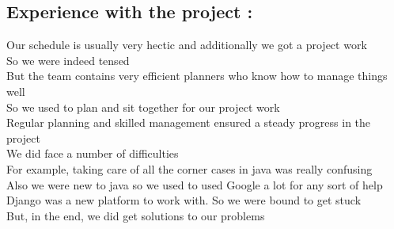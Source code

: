 \documentclass{article}
\begin{document}
\subsection*{Experience with the project : }
\hspace*{5 mm}Our schedule is usually very hectic and additionally we got a project work \\
\hspace*{5 mm}So we were indeed tensed \\
\hspace*{5 mm}But the team contains very efficient planners who know how to manage things well \\
\hspace*{5 mm}So we used to plan and sit together for our project work \\
\hspace*{5 mm}Regular planning and skilled management ensured a steady progress in the project \\
\hspace*{5 mm}We did face a number of difficulties \\
\hspace*{5 mm}For example, taking care of all the corner cases in java was really confusing \\
\hspace*{5 mm}Also we were new to java so we used to used Google a lot for any sort of help \\
\hspace*{5 mm}Django was a new platform to work with. So we were bound to get stuck \\
\hspace*{5 mm}But, in the end, we did get solutions to our problems \\
\pagebreak
\end{document}

